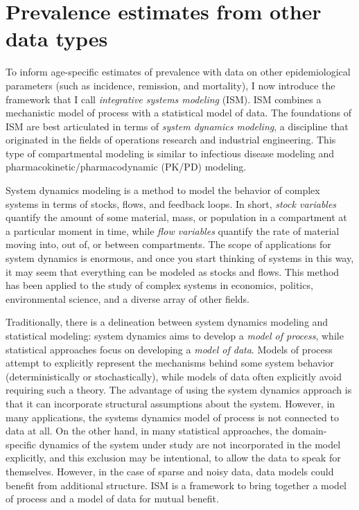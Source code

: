 \chapter{Prevalence estimates from other data types}
\label{theory-system_dynamics}

To inform age-specific estimates of prevalence with data on
other epidemiological parameters (such as incidence, remission, and
mortality), I now introduce the framework that I call
\emph{integrative systems modeling} (ISM).  ISM combines a mechanistic model of
process with a statistical model of data.  The foundations of ISM are
best articulated in terms of \emph{system dynamics modeling}, a
discipline that originated in the fields of operations research and
industrial engineering. \cite{forrester_industrial_1961,
  forrester_urban_1969,forrester_world_1973,meadows_thinking_2008}
This type of compartmental modeling is similar to infectious disease
modeling \cite{hethcote_qualitative_1976,anderson_infectious_1992,
  diekmann_mathematical_2000,keeling_modeling_2008,
  vynnycky_introduction_2010} and pharmacokinetic/pharmacodynamic
(PK/PD) modeling.
\cite{sheiner_modelling_1972,jacquez_compartmental_1985,yuh_population_1994,
  barrett_saam_1998,jacquez_modeling_1999,atkinson_introduction_2007}

System dynamics modeling is a method to model the behavior of complex
systems in terms of stocks, flows, and feedback loops.  In short,
\emph{stock variables} quantify the amount of some material, mass, or
population in a compartment at a particular moment in time, while
\emph{flow variables} quantify the rate of material moving into, out
of, or between compartments. The scope of applications for system
dynamics is enormous, and once you start thinking of systems in this
way, it may seem that everything can be modeled as stocks and
flows. This method has been applied to the study of complex systems in
economics, politics, environmental science, and a diverse array of
other fields.  \cite{meadows_thinking_2008,jacquez_modeling_1999,
  harte_consider_1988,richardson_feedback_1991}


Traditionally, there is a delineation between system dynamics modeling
and statistical modeling: system dynamics aims to
develop a \emph{model of process}, while statistical approaches focus
on developing a \emph{model of data}. Models of process attempt to
explicitly represent the mechanisms behind some system behavior
(deterministically or stochastically), while models of data often
explicitly avoid requiring such a theory. The advantage of using the
system dynamics approach is that it can incorporate structural
assumptions about the system.  However, in many applications, the
systems dynamics model of process is not connected to data at all.  On
the other hand, in many statistical approaches, the domain-specific
dynamics of the system under study are not incorporated in the model
explicitly, and this exclusion may be intentional, to allow the data
to speak for themselves.  However, in the case of sparse and noisy data, data
models could benefit from additional structure.  ISM
is a framework to bring together a model of process
and a model of data for mutual benefit.

